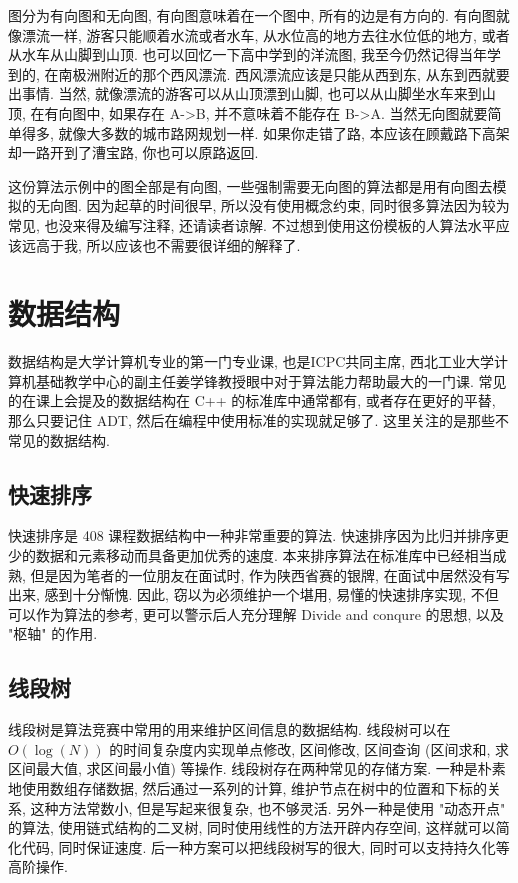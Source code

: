 \documentclass[a4paper]{ctexbook}
\begin{document}
图分为有向图和无向图, 有向图意味着在一个图中, 所有的边是有方向的. 有向图就像漂流一样, 游客只能顺着水流或者水车, 从水位高的地方去往水位低的地方, 或者从水车从山脚到山顶. 也可以回忆一下高中学到的洋流图, 我至今仍然记得当年学到的, 在南极洲附近的那个西风漂流. 西风漂流应该是只能从西到东, 从东到西就要出事情. 当然, 就像漂流的游客可以从山顶漂到山脚, 也可以从山脚坐水车来到山顶, 在有向图中, 如果存在 A->B, 并不意味着不能存在 B->A. 当然无向图就要简单得多, 就像大多数的城市路网规划一样. 如果你走错了路, 本应该在顾戴路下高架却一路开到了漕宝路, 你也可以原路返回.

这份算法示例中的图全部是有向图, 一些强制需要无向图的算法都是用有向图去模拟的无向图. 因为起草的时间很早, 所以没有使用概念约束, 同时很多算法因为较为常见, 也没来得及编写注释, 还请读者谅解. 不过想到使用这份模板的人算法水平应该远高于我, 所以应该也不需要很详细的解释了.



\chapter{数据结构}

数据结构是大学计算机专业的第一门专业课, 也是ICPC共同主席, 西北工业大学计算机基础教学中心的副主任姜学锋教授眼中对于算法能力帮助最大的一门课. 常见的在课上会提及的数据结构在 C++ 的标准库中通常都有, 或者存在更好的平替, 那么只要记住 ADT, 然后在编程中使用标准的实现就足够了. 这里关注的是那些不常见的数据结构.

\section{快速排序}

快速排序是 408 课程数据结构中一种非常重要的算法. 快速排序因为比归并排序更少的数据和元素移动而具备更加优秀的速度. 本来排序算法在标准库中已经相当成熟, 但是因为笔者的一位朋友在面试时, 作为陕西省赛的银牌, 在面试中居然没有写出来, 感到十分惭愧. 因此, 窃以为必须维护一个堪用, 易懂的快速排序实现, 不但可以作为算法的参考, 更可以警示后人充分理解 Divide and conqure 的思想, 以及 "枢轴" 的作用.



\section{线段树}

线段树是算法竞赛中常用的用来维护区间信息的数据结构. 线段树可以在 $O(\log(N))$ 的时间复杂度内实现单点修改, 区间修改, 区间查询 (区间求和, 求区间最大值, 求区间最小值) 等操作. 线段树存在两种常见的存储方案. 一种是朴素地使用数组存储数据, 然后通过一系列的计算, 维护节点在树中的位置和下标的关系, 这种方法常数小, 但是写起来很复杂, 也不够灵活. 另外一种是使用 "动态开点" 的算法, 使用链式结构的二叉树, 同时使用线性的方法开辟内存空间, 这样就可以简化代码, 同时保证速度. 后一种方案可以把线段树写的很大, 同时可以支持持久化等高阶操作.
\end{document}

